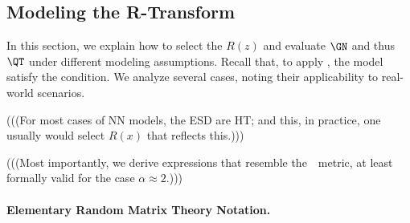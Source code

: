 \subsection{Modeling the R-Transform}
\label{sxn:r_transforms}

In this section, we explain how to select the \RTransform $R(z)$ and evaluate $\GN$ and thus $\QT$ under different modeling assumptions.
Recall that, to apply \SETOL, the model satisfy the \TRACELOG condition.
We analyze several cases, noting their applicability to real-world scenarios.

(((For most cases of NN models, the ESD are HT; and this, in practice, one usually would select $R(x)$ that reflects this.)))

(((Most importantly,  we derive expressions that resemble the~\WW~\ALPHAHAT metric, at least formally valid
for the case $\alpha\approx 2$.)))


\paragraph{Elementary Random Matrix Theory Notation.}

